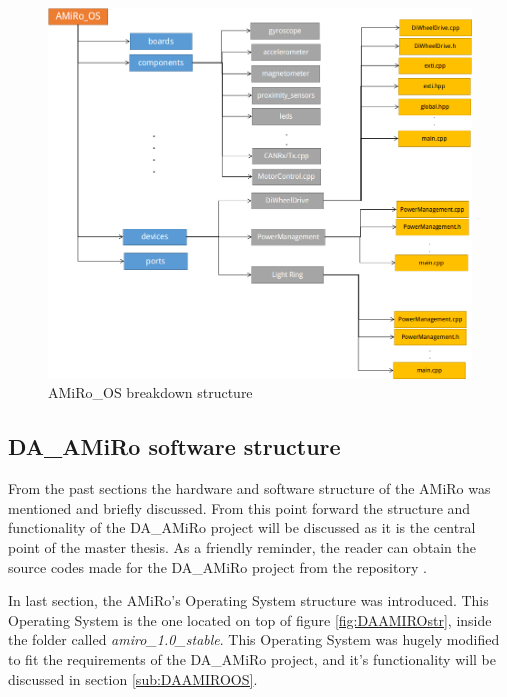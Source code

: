 \documentclass[12pt]{report}%
\begin{document}
\begin{figure}[ht]
	\centering
	\includegraphics[width=\textwidth]{AMiRo_OS}
    \caption{AMiRo\_OS breakdown structure}
    \label{fig:OS}
\end{figure}


\subsection{DA\_AMiRo software structure}
From the past sections the hardware and software structure of the AMiRo was mentioned and briefly discussed. From this point forward the structure and functionality of the DA\_AMiRo project will be discussed as it is the central point of the master thesis. As a friendly reminder, the reader can obtain the source codes made for the DA\_AMiRo project from the repository \cite{AMiRo_Git}.

In last section, the AMiRo's Operating System structure was introduced. This Operating System is the one located on top of figure \ref{fig:DAAMIROstr}, inside the folder called \textit{amiro\_1.0\_stable}. This Operating System was hugely modified to fit the requirements of the DA\_AMiRo project, and it's functionality will be discussed in section \ref{sub:DAAMIROOS}.
\end{document}
